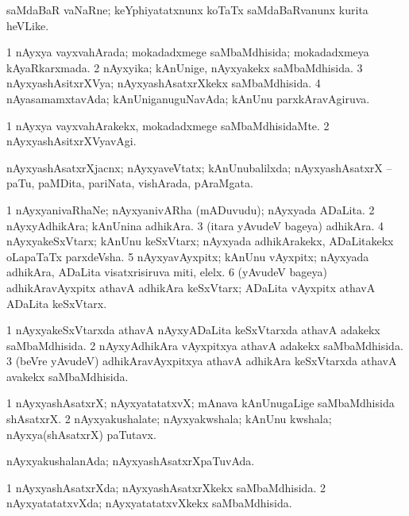\bentry
{}
\gl{\nA}
\bmng
saMdaBaR vaNaRne; keYphiyatatxnunx koTaTx saMdaBaRvanunx kurita heVLike. 
\emng
\eentry

\bentry
{}
\gl{\gu}
\bmng
\bnum
\num{1} nAyxya vayxvahArada; mokadadxmege saMbaMdhisida; mokadadxmeya kAyaRkarxmada. 
\num{2} nAyxyika; kAnUnige, nAyxyakekx saMbaMdhisida. 
\num{3} nAyxyashAsitxrXVya; nAyxyashAsatxrXkekx saMbaMdhisida. 
\num{4} nAyasamamxtavAda; kAnUniganuguNavAda; kAnUnu parxkAravAgiruva. 
\enum
\emng
\eentry

\bentry
{}
\gl{\kirxvi}
\bmng
\bnum
\num{1} nAyxya vayxvahArakekx, mokadadxmege saMbaMdhisidaMte. 
\num{2} nAyxyashAsitxrXVyavAgi. 
\enum
\emng
\eentry

\bentry
{}
\gl{\nA}
\bmng
nAyxyashAsatxrXjacnx; nAyxyaveVtatx; kAnUnubalilxda; nAyxyashAsatxrX -- paTu, paMDita, pariNata, vishArada, pAraMgata. 
\emng
\eentry

\bentry
{}
\gl{\nA}
\bmng
\bnum
\num{1} nAyxyanivaRhaNe; nAyxyanivARha (mADuvudu); nAyxyada ADaLita. 
\num{2} nAyxyAdhikAra; kAnUnina adhikAra. 
\num{3} (itara yAvudeV bageya) adhikAra. 
\num{4} nAyxyakeSxVtarx; kAnUnu keSxVtarx; nAyxyada adhikArakekx, ADaLitakekx oLapaTaTx parxdeVsha. 
\num{5} nAyxyavAyxpitx; kAnUnu vAyxpitx; nAyxyada adhikAra, ADaLita visatxrisiruva miti, elelx. 
\num{6} (yAvudeV bageya) adhikAravAyxpitx athavA adhikAra keSxVtarx; ADaLita vAyxpitx athavA ADaLita keSxVtarx. 
\enum
\emng
\eentry

\bentry
{}
\gl{\gu}
\bmng
\bnum
\num{1} nAyxyakeSxVtarxda athavA nAyxyADaLita keSxVtarxda athavA adakekx saMbaMdhisida. 
\num{2} nAyxyAdhikAra vAyxpitxya athavA adakekx saMbaMdhisida. 
\num{3} (beVre yAvudeV) adhikAravAyxpitxya athavA adhikAra keSxVtarxda athavA avakekx saMbaMdhisida. 
\enum
\emng
\eentry

\bentry
{}
\gl{\nA}
\bmng
\bnum
\num{1} nAyxyashAsatxrX; nAyxyatatatxvX; mAnava kAnUnugaLige saMbaMdhisida shAsatxrX. 
\num{2} nAyxyakushalate; nAyxyakwshala; kAnUnu kwshala; nAyxya(shAsatxrX) paTutavx. 
\enum
\emng
\eentry

\bentry
{}
\gl{\gu}
\bmng
nAyxyakushalanAda; nAyxyashAsatxrXpaTuvAda. 
\emng
\eentry

\bentry
{}
\gl{\gu}
\bmng
\bnum
\num{1} nAyxyashAsatxrXda; nAyxyashAsatxrXkekx saMbaMdhisida. 
\num{2} nAyxyatatatxvXda; nAyxyatatatxvXkekx saMbaMdhisida. 
\enum
\emng
\eentry

